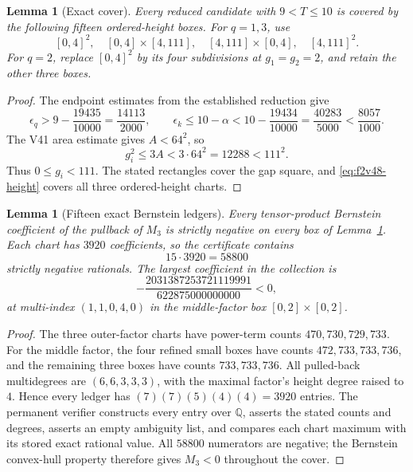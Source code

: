 \documentclass[11pt]{article}
\newtheorem{lemma}[theorem]{Lemma}
\theoremstyle{definition}
\theoremstyle{remark}
\begin{document}
\begin{lemma}[Exact cover]
\label{lem:f2v48-cover}
Every reduced candidate with \(9<T\le10\) is covered by the following fifteen
ordered-height boxes.  For \(q=1,3\), use
\[
 [0,4]^2,\quad [0,4]\times[4,111],\quad
 [4,111]\times[0,4],\quad[4,111]^2.
\]
For \(q=2\), replace \([0,4]^2\) by its four subdivisions at \(g_1=g_2=2\),
and retain the other three boxes.
\end{lemma}

\begin{proof}
The endpoint estimates from the established reduction give
\begin{equation}
 \epsilon_q>9-\frac{19435}{10000}=\frac{14113}{2000},\qquad
 \epsilon_k\le10-\alpha
 <10-\frac{19434}{10000}=\frac{40283}{5000}
 <\frac{8057}{1000}.
 \label{eq:f2v48-height-cover}
\end{equation}
The V41 area estimate gives \(A<64^2\), so
\begin{equation}
 g_i^2\le3A<3\cdot64^2=12288<111^2.
 \label{eq:f2v48-gap-cover}
\end{equation}
Thus \(0\le g_i<111\).  The stated rectangles cover the gap square, and
\eqref{eq:f2v48-height} covers all three ordered-height charts.
\end{proof}

\begin{lemma}[Fifteen exact Bernstein ledgers]
\label{lem:f2v48-ledgers}
Every tensor-product Bernstein coefficient of the pullback of \(M_3\) is strictly
negative on every box of Lemma~\ref{lem:f2v48-cover}.  Each chart has \(3920\)
coefficients, so the certificate contains
\begin{equation}
 15\cdot3920=58800
 \label{eq:f2v48-total}
\end{equation}
strictly negative rationals.  The largest coefficient in the collection is
\begin{equation}
 -\frac{2031387253721119991}{622875000000000}<0,
 \label{eq:f2v48-margin}
\end{equation}
at multi-index \((1,1,0,4,0)\) in the middle-factor box
\([0,2]\times[0,2]\).
\end{lemma}

\begin{proof}
The three outer-factor charts have power-term counts \(470,730,729,733\).
For the middle factor, the four refined small boxes have counts
\(472,733,733,736\), and the remaining three boxes have counts \(733,733,736\).
All pulled-back multidegrees are \((6,6,3,3,3)\), with the maximal factor's
height degree raised to \(4\).  Hence every ledger has
\((7)(7)(5)(4)(4)=3920\) entries.  The permanent verifier constructs every entry
over \(\mathbb Q\), asserts the stated counts and degrees, asserts an empty
ambiguity list, and compares each chart maximum with its stored exact rational
value.  All \(58800\) numerators are negative; the Bernstein convex-hull property
therefore gives \(M_3<0\) throughout the cover.
\end{proof}
\end{document}
